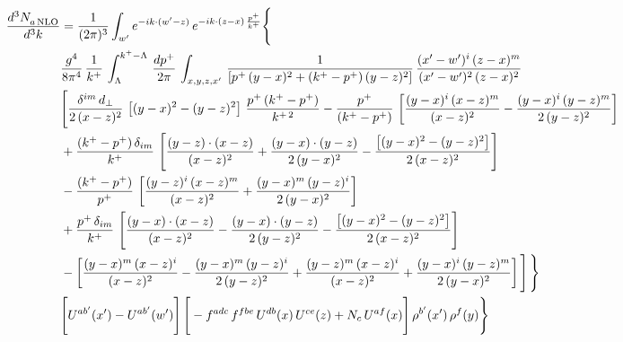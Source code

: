 \documentclass[9pt]{article}
\numberwithin{equation}{section}
\begin{document}
\begin{align}
    \frac{d^{3}N_{a\,\rm NLO}^{\rm}}{d^{3}k}  & =  \frac{1}{(2\pi)^{3}}  \int_{w^\prime} e^{-ik\cdot(w'-z)}\,e^{-ik\cdot (z-x)\,\frac{p^{+}}{k^{+}}} \Bigg\{\notag \\ & \frac{g^{4}}{8\pi^{4}}\,\frac{1}{k^{+}}\,\int_{\Lambda}^{k^{+}-\Lambda}\, \frac{dp^{+}}{2\pi} \, \int_{x,y,z,x'}\,\frac{1}{\left[p^{+}\,(y-x)^{2}+(k^{+}-p^{+})\,(y-z)^{2}\right]}\, \frac{(x'-w')^{i}\,(z-x)^{m}}{(x'-w')^{2}\,(z-x)^{2}} \notag \\ & \Bigg[\frac{\delta^{im}\,d_{\perp}}{2\,(x-z)^{2}}\,\left[(y-x)^{2}-(y-z)^{2}\right]\,\frac{p^{+}\,(k^{+}-p^{+})}{k^{+\,2}}-\frac{p^{+}}{(k^{+}-p^{+})}\,\left[\frac{(y-x)^{i}\,(x-z)^{m}}{(x-z)^{2}}-\frac{(y-x)^{i}\,(y-z)^{m}}{2\,(y-z)^{2}}\right]\notag \\ & +\frac{(k^{+}-p^{+})\,\delta_{im}}{k^{+}}\,\left[\frac{(y-z)\cdot (x-z)}{(x-z)^{2}}+\frac{(y-x)\cdot (y-z)}{2\,(y-x)^{2}}-\frac{\left[(y-x)^{2}-(y-z)^{2}\right]}{2\,(x-z)^{2}}\right]\notag \\ & -\frac{(k^{+}-p^{+})}{p^{+}}\,\left[\frac{(y-z)^{i}\,(x-z)^{m}}{(x-z)^{2}}+\frac{(y-x)^{m}\,(y-z)^{i}}{2\,(y-x)^{2}}\right]\notag \\ & +\frac{p^{+}\,\delta_{im}}{k^{+}}\,\left[\frac{(y-x)\cdot (x-z)}{(x-z)^{2}}-\frac{(y-x)\cdot (y-z)}{2\,(y-z)^{2}}-\frac{\left[(y-x)^{2}-(y-z)^{2}\right]}{2\,(x-z)^{2}}\right]\notag \\ &-\left[\frac{(y-x)^{m}\,(x-z)^{i}}{(x-z)^{2}}-\frac{(y-x)^{m}\,(y-z)^{i}}{2\,(y-z)^{2}}+\frac{(y-z)^{m}\,(x-z)^{i}}{(x-z)^{2}}+\frac{(y-x)^{i}\,(y-z)^{m}}{2\,(y-x)^{2}}\right]\Bigg]\,\Bigg\} \notag \\ & \Bigg[U^{ab'}(x')-U^{ab'}(w')\Bigg]\,\Bigg[-f^{adc}\,f^{fbe}\,U^{db}(x)\,U^{ce}(z)+N_{c}\,U^{af}(x)\Bigg]\,\rho^{b'}(x')\,\rho^{f}(y)\Bigg\}
\end{align}
\end{document}
